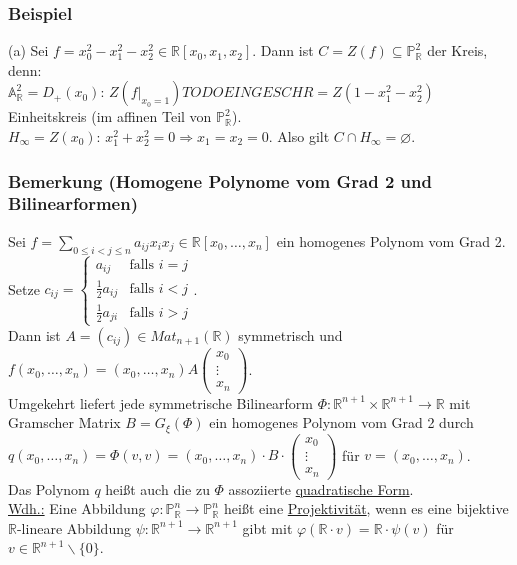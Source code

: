 \documentclass[a4paper]{article}
\newcommand{\ul}{\underline}
\let\phi\varphi
\begin{document}
\subsubsection{Beispiel}
(a) Sei \(f=x_0^2-x_1^2-x_2^2\in\mathbb{R}\left[x_0,x_1,x_2\right]\). Dann ist \(C=Z(f)\subseteq\mathbb{P}_\mathbb{R}^2\) der Kreis, denn:\\
\(\mathbb{A}_\mathbb{R}^2=D_+(x_0)\): \(Z(f|_{x_0=1})TODO EINGESCHR=Z(1-x_1^2-x_2^2)\) Einheitskreis (im affinen Teil von \(\mathbb{P}_\mathbb{R}^2\)).\\
\(H_\infty=Z(x_0)\): \(x_1^2+x_2^2=0\Rightarrow x_1=x_2=0\). Also gilt \(C\cap H_\infty=\varnothing\).
\subsubsection{Bemerkung (Homogene Polynome vom Grad 2 und Bilinearformen)}
Sei \(f=\sum_{0\leq i<j\leq n}a_{ij}x_ix_j\in\mathbb{R}\left[x_0,\dots,x_n\right]\) ein homogenes Polynom vom Grad 2.\\
Setze \(c_{ij}=\begin{cases}
a_{ij} & \text{falls }i=j\\
\frac{1}{2}a_{ij} & \text{falls }i<j\\
\frac{1}{2}a_{ji} & \text{falls }i>j
\end{cases}\).\\
Dann ist \(A=(c_{ij})\in Mat_{n+1}(\mathbb{R})\) symmetrisch und \(f(x_0,\dots,x_n)=(x_0,\dots,x_n)A\begin{pmatrix}
x_0\\
\vdots\\
x_n
\end{pmatrix}\).\\
Umgekehrt liefert jede symmetrische Bilinearform \(\Phi:\mathbb{R}^{n+1}\times \mathbb{R}^{n+1}\rightarrow\mathbb{R}\) mit Gramscher Matrix \(B=G_\xi(\Phi)\) ein homogenes Polynom vom Grad 2 durch \(q(x_0,\dots,x_n)=\Phi(v,v)=(x_0,\dots,x_n)\cdot B\cdot \begin{pmatrix}
x_0\\
\vdots\\
x_n
\end{pmatrix}\) für \(v=(x_0,\dots,x_n)\).\\
Das Polynom \(q\) heißt auch die zu \(\Phi\) assoziierte \ul{quadratische Form}.\\
\ul{Wdh.:} Eine Abbildung \(\phi:\mathbb{P}_\mathbb{R}^n\rightarrow\mathbb{P}_\mathbb{R}^n\) heißt eine \ul{Projektivität}, wenn es eine bijektive \(\mathbb{R}\)-lineare Abbildung \(\psi:\mathbb{R}^{n+1}\rightarrow\mathbb{R}^{n+1}\) gibt mit \(\phi(\mathbb{R}\cdot v)=\mathbb{R}\cdot\psi(v)\) für \(v\in \mathbb{R}^{n+1}\backslash\{0\}\).
\end{document}
